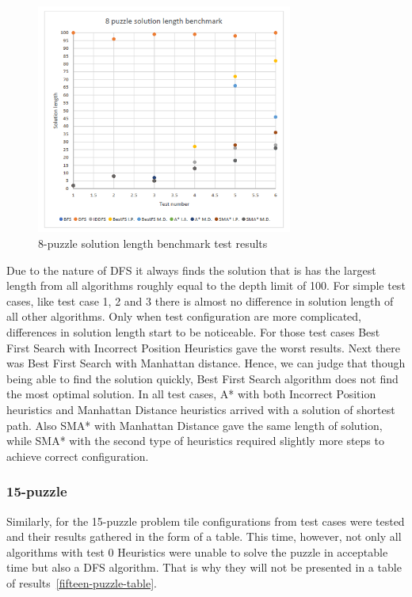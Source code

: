 \documentclass[12pt]{article}
\begin{document}
 \begin{figure}[h]
    \includegraphics[width=0.75\textwidth]{8_puzzle_length}
    \centering
    \caption{8-puzzle solution length benchmark test results}
\label {eight-puzzle-plot-length}
\end{figure}

Due to the nature of DFS it always finds the solution that is has the largest length from all algorithms roughly equal to the depth limit of 100. For simple test cases, like test case 1, 2 and 3 there is almost no difference in solution length of all other algorithms. Only when test configuration are more complicated, differences in solution length start to be noticeable. For those test cases Best First Search with Incorrect Position Heuristics gave the worst results. Next there was Best First Search with Manhattan distance. Hence, we can judge that though being able to find the solution quickly, Best First Search algorithm does not find the most optimal solution. In all test cases, A* with both Incorrect Position heuristics and Manhattan Distance heuristics arrived with a solution of shortest path. Also SMA* with Manhattan Distance gave the same length of solution, while SMA* with the second type of heuristics required slightly more steps to achieve correct configuration. 

\newpage
\subsubsection {15-puzzle}

Similarly, for the 15-puzzle problem tile configurations from test cases were tested and their results gathered in the form of a table. This time, however, not only all algorithms with test 0 Heuristics were unable to solve the puzzle in acceptable time but also a DFS algorithm. That is why they will not be presented in a table of results~\ref{fifteen-puzzle-table}. 
\end{document}

